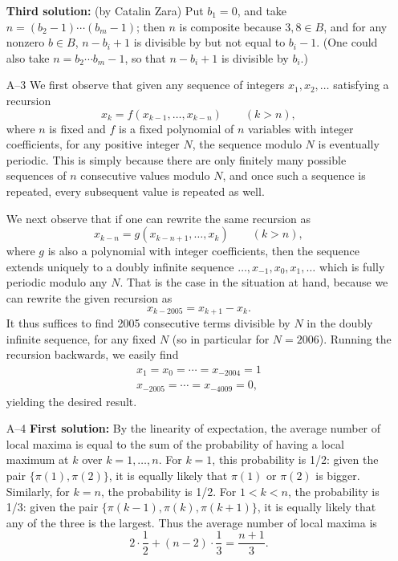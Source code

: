 \documentclass[amssymb,twocolumn,pra,10pt,aps]{revtex4-1}
\begin{document}
\begin{itemize}
\textbf{Third solution:} (by Catalin Zara)
Put $b_1 = 0$, and take $n = (b_2 - 1)\cdots(b_m - 1)$; then $n$ is
composite because $3, 8 \in B$, and for any nonzero $b \in B$,
$n - b_i + 1$ is divisible by but not equal to $b_i - 1$.
(One could also take $n = b_2 \cdots b_m - 1$, so that
$n-b_i+1$ is divisible by $b_i$.)

\item[A--3]
We first observe that given any sequence of integers
$x_1, x_2, \dots$ satisfying a recursion
\[
x_k = f(x_{k-1}, \dots, x_{k-n}) \qquad (k > n),
\]
where $n$ is fixed and $f$ is a fixed polynomial of $n$ variables with
integer coefficients, for any positive integer $N$, the sequence modulo $N$
is eventually periodic. This is simply because there are only finitely many
possible sequences of $n$ consecutive values modulo $N$, and once such
a sequence is repeated, every subsequent value is repeated as well.

We next observe that if one can rewrite the same recursion as
\[
x_{k-n} = g(x_{k-n+1}, \dots, x_k) \qquad (k > n),
\]
where $g$ is also a polynomial with integer coefficients, then
the sequence extends uniquely to a doubly infinite sequence $\dots,
x_{-1}, x_0, x_1, \dots$ which is fully periodic modulo any $N$.
That is the case in the
situation at hand, because we can rewrite the given recursion as
\[
x_{k-2005} = x_{k+1} - x_k.
\]
It thus suffices to find 2005 consecutive terms divisible by $N$ in the
doubly infinite sequence, for any fixed $N$ (so in particular for
$N = 2006$).
Running the recursion backwards, we easily find
\begin{gather*}
x_1 = x_0 = \cdots = x_{-2004} = 1 \\
x_{-2005} = \cdots = x_{-4009} = 0,
\end{gather*}
yielding the desired result.

\item[A--4]
\textbf{First solution:}
By the linearity of expectation, the average number of local maxima is equal
to the sum of the probability of having a local maximum at $k$ over
$k=1,\dots, n$.
For $k=1$, this probability is 1/2: given the pair
$\{\pi(1), \pi(2)\}$, it is equally likely that $\pi(1)$ or $\pi(2)$ is
bigger. Similarly, for $k=n$, the probability is 1/2. For $1 < k < n$,
the probability is 1/3: given the pair $\{\pi(k-1), \pi(k), \pi(k+1)\}$,
it is equally likely that any of the three is the largest.
Thus the average number of local maxima is
\[
2 \cdot \frac{1}{2} + (n-2) \cdot \frac{1}{3} =
\frac{n+1}{3}.
\]


\end{itemize}
\end{document}
